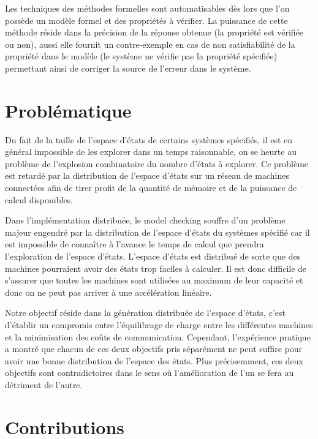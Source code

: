 Les techniques des méthodes formelles sont automatisables dès lors que l’on possède un modèle formel et des propriétés à vérifier. La puissance de cette méthode réside dans la précision de la réponse obtenue (la propriété est vérifiée ou non),  aussi elle fournit un contre-exemple en cas de non satisfiabilité de la propriété dans le modèle (le système ne vérifie pas la propriété spécifiée) permettant ainsi de corriger la source de l'erreur dans le système.

\section*{Problématique}
Du fait de la taille de l'espace d'états de certains systèmes spécifiés, il est en général impossible de les explorer dans un temps raisonnable, on se heurte au problème de l'explosion combinatoire du nombre d'états à explorer. Ce problème est retardé par la distribution de l'espace d'états sur un réseau de machines connectées afin de tirer profit de la quantité de mémoire et de la puissance de calcul disponibles.

Dans l’implémentation distribuée, le model checking souffre d'un problème majeur engendré par la distribution de l'espace d'états du systèmes spécifié car il est impossible de connaître à l’avance le temps de calcul que prendra l’exploration de l'espace d'états. L'espace d'états est distribué de sorte que des machines pourraient avoir des états trop faciles à calculer. Il est donc difficile de s’assurer que toutes les machines sont utilisées au maximum de leur capacité et donc on ne peut pas arriver à une accélération linéaire.

Notre objectif réside dans la génération distribuée de l'espace d'états, c'est d’établir un compromis entre l’équilibrage de charge entre les différentes machines et la minimisation des coûts de communication. Cependant, l’expérience pratique a montré que chacun de ces deux objectifs pris séparément ne peut suffire pour avoir une bonne distribution de l’espace des états. Plus précisemment, ces deux objectifs sont contradictoires dans le sens où l'amélioration de l'un se fera au détriment de l'autre.

\section*{Contributions}

